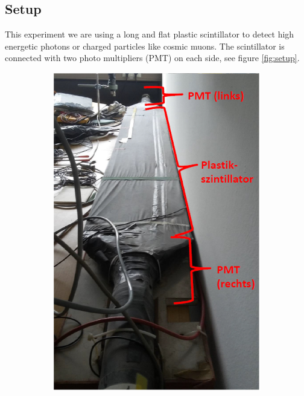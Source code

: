 \documentclass[]{article}
\begin{document}
\subsection{Setup}\label{setup}
This experiment we are using a long and flat plastic scintillator to detect high energetic photons or charged particles like cosmic muons. The scintillator is connected with two photo multipliers (PMT) on each side, see figure \ref{fig:setup}.

\begin{figure}[H]
\centering
\begin{subfigure}[h]{0.4\textwidth}
\includegraphics[width=1\textwidth]{Plots/Scintillator.jpg}
\end{subfigure}
\begin{subfigure}[h]{0.59\textwidth}

\end{subfigure}
\end{figure}
\end{document}
